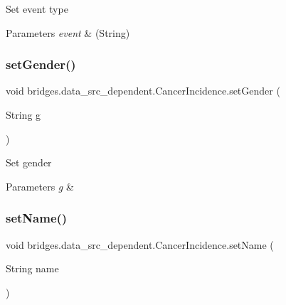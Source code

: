 Set event type


\begin{DoxyParams}{Parameters}
{\em event} & (String) \\
\hline
\end{DoxyParams}
\hypertarget{classbridges_1_1data__src__dependent_1_1_cancer_incidence_a217681578e13197e1d177932c73ea80f}{}\label{classbridges_1_1data__src__dependent_1_1_cancer_incidence_a217681578e13197e1d177932c73ea80f} 
\subsubsection{\texorpdfstring{set\+Gender()}{setGender()}}
{\footnotesize\ttfamily void bridges.\+data\+\_\+src\+\_\+dependent.\+Cancer\+Incidence.\+set\+Gender (\begin{DoxyParamCaption}\item[{String}]{g }\end{DoxyParamCaption})}

Set gender


\begin{DoxyParams}{Parameters}
{\em g} & \\
\hline
\end{DoxyParams}
\hypertarget{classbridges_1_1data__src__dependent_1_1_cancer_incidence_a1aef58b128adfd1e2a31ab9726247e9e}{}\label{classbridges_1_1data__src__dependent_1_1_cancer_incidence_a1aef58b128adfd1e2a31ab9726247e9e} 
\subsubsection{\texorpdfstring{set\+Name()}{setName()}}
{\footnotesize\ttfamily void bridges.\+data\+\_\+src\+\_\+dependent.\+Cancer\+Incidence.\+set\+Name (\begin{DoxyParamCaption}\item[{String}]{name }\end{DoxyParamCaption})}

